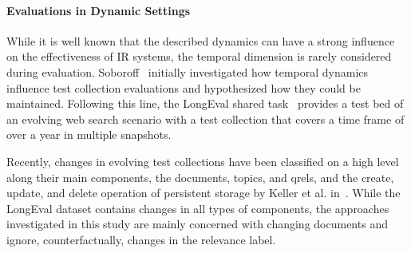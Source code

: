 \paragraph{Evaluations in Dynamic Settings}
While it is well known that the described dynamics can have a strong influence on the effectiveness of IR systems, the temporal dimension is rarely considered during evaluation. Soboroff~\cite{DBLP:conf/sigir/Soboroff06} initially investigated how temporal dynamics influence test collection evaluations and hypothesized how they could be maintained. Following this line, the LongEval shared task~\cite{DBLP:conf/clef/AlkhalifaBDEAFG24,DBLP:conf/clef/AlkhalifaBBCDEA23} provides a test bed of an evolving web search scenario with a test collection that covers a time frame of over a year in multiple snapshots.

Recently, changes in evolving test collections have been classified on a high level along their main components, the documents, topics, and qrels, and the create, update, and delete operation of persistent storage by Keller et al. in~\cite{keller:2024}. While the LongEval dataset contains changes in all types of components, the approaches investigated in this study are mainly concerned with changing documents and ignore, counterfactually, changes in the relevance label.